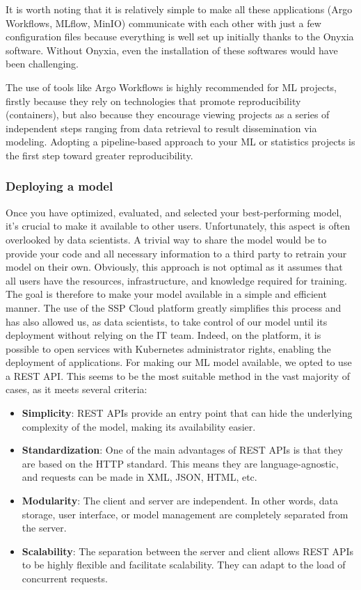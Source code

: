 It is worth noting that it is relatively simple to make all these applications (Argo Workflows, MLflow, MinIO) communicate with each other with just a few configuration files because everything is well set up initially thanks to the Onyxia software. Without Onyxia, even the installation of these softwares would have been challenging.

The use of tools like Argo Workflows is highly recommended for ML projects, firstly because they rely on technologies that promote reproducibility (containers), but also because they encourage viewing projects as a series of independent steps ranging from data retrieval to result dissemination via modeling. Adopting a pipeline-based approach to your ML or statistics projects is the first step toward greater reproducibility.

\subsubsection{Deploying a model}

Once you have optimized, evaluated, and selected your best-performing model, it's crucial to make it available to other users. Unfortunately, this aspect is often overlooked by data scientists. A trivial way to share the model would be to provide your code and all necessary information to a third party to retrain your model on their own. Obviously, this approach is not optimal as it assumes that all users have the resources, infrastructure, and knowledge required for training. The goal is therefore to make your model available in a simple and efficient manner. The use of the SSP Cloud platform greatly simplifies this process and has also allowed us, as data scientists, to take control of our model until its deployment without relying on the IT team. Indeed, on the platform, it is possible to open services with Kubernetes administrator rights, enabling the deployment of applications. For making our ML model available, we opted to use a REST API. This seems to be the most suitable method in the vast majority of cases, as it meets several criteria:

\begin{itemize}
    \item \textbf{Simplicity}: REST APIs provide an entry point that can hide the underlying complexity of the model, making its availability easier.
    \item \textbf{Standardization}: One of the main advantages of REST APIs is that they are based on the HTTP standard. This means they are language-agnostic, and requests can be made in XML, JSON, HTML, etc.
    \item \textbf{Modularity}: The client and server are independent. In other words, data storage, user interface, or model management are completely separated from the server.
    \item \textbf{Scalability}: The separation between the server and client allows REST APIs to be highly flexible and facilitate scalability. They can adapt to the load of concurrent requests.
\end{itemize}

